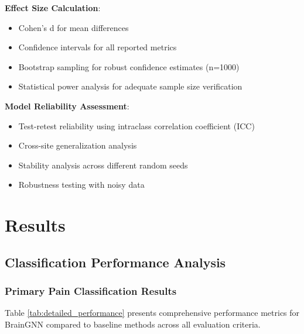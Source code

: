 \documentclass[10pt,journal,compsoc]{IEEEtran}
\begin{document}
\textbf{Effect Size Calculation}:
\begin{itemize}
\item Cohen's d for mean differences
\item Confidence intervals for all reported metrics
\item Bootstrap sampling for robust confidence estimates (n=1000)
\item Statistical power analysis for adequate sample size verification
\end{itemize}

\textbf{Model Reliability Assessment}:
\begin{itemize}
\item Test-retest reliability using intraclass correlation coefficient (ICC)
\item Cross-site generalization analysis
\item Stability analysis across different random seeds
\item Robustness testing with noisy data
\end{itemize}

\section{Results}

\subsection{Classification Performance Analysis}

\subsubsection{Primary Pain Classification Results}

Table \ref{tab:detailed_performance} presents comprehensive performance metrics for BrainGNN compared to baseline methods across all evaluation criteria.
\end{document}
